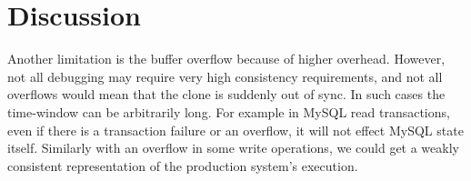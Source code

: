 


\section{Discussion}
\label{sec:discussion}




Another limitation is the buffer overflow because of higher overhead. 
However, not all debugging may require very high consistency requirements, and not all overflows would mean that the clone is suddenly out of sync. 
In such cases the time-window can be arbitrarily long. 
For example in MySQL read transactions, even if there is a transaction failure or an overflow, it will not effect MySQL state itself.
Similarly with an overflow in some write operations, we could get a weakly consistent representation of the production system's execution.
\fi

